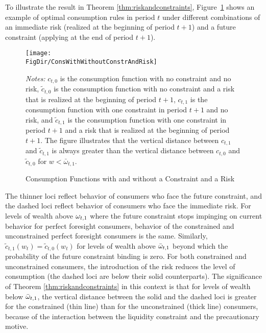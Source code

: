 To illustrate the result in Theorem \ref{thm:riskandconstraints}, Figure~\ref{fig:SolveConstrCompare4Cases} shows an example of optimal consumption rules in period $t$ under different combinations of an immediate risk (realized at the beginning of period $t+1$) and a future constraint (applying at the end of period $t+1$).
\hypertarget{ConsWithWithoutConstrAndRisk}{}
\begin{figure}[ht]
	{\centering
\texttt{[image: \\FigDir/ConsWithWithoutConstrAndRisk]}}

\caption{Consumption Functions with and without a Constraint and a Risk}
{\footnotesize \begin{singlespace} {\emph{Notes:} $c_{t,0}$ is the consumption function with no constraint and no risk, $\tilde{c}_{t,0}$ is the consumption function with no constraint and a risk that is realized at the beginning of period $t+1$, $c_{t,1}$ is the consumption function with one constraint in period $t+1$ and no risk, and $\tilde{c}_{t,1}$ is the consumption function with one constraint in period $t+1$ and a risk that is realized at the beginning of period $t+1$. The figure illustrates that the vertical distance between $c_{t,1}$ and $\tilde{c}_{t,1}$ is always greater than the vertical distance between $c_{t,0}$ and $\tilde{c}_{t,0}$ for $w < \bar{\omega}_{t,1}$. }  \end{singlespace}}
\label{fig:SolveConstrCompare4Cases}
\end{figure}
The thinner loci reflect behavior of consumers who face the future constraint, and the dashed loci reflect behavior of consumers who face the immediate risk. For levels of wealth above $\omega_{t,1}$ where the future constraint stops impinging on current behavior for perfect foresight consumers, behavior of the constrained and unconstrained perfect foresight consumers is the same. Similarly, $\tilde{c}_{t,1}(w_{t}) = \tilde{c}_{t,0}(w_{t})$ for levels of wealth above ${\bar{\omega}}_{t,1}$ beyond which the probability of the future constraint binding is zero. For both constrained and unconstrained consumers, the introduction of the risk reduces the level of consumption (the dashed loci are below their solid counterparts). The significance of Theorem \ref{thm:riskandconstraints} in this context is that for levels of wealth below ${\bar{\omega}}_{t,1}$, the vertical distance between the solid and the dashed loci is greater for the constrained (thin line) than for the unconstrained (thick line) consumers, because of the interaction between the liquidity constraint and the precautionary motive.


